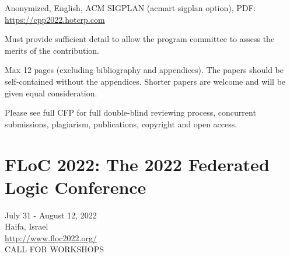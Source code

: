 \documentclass[prodmode,acmtecs]{acmsmall} %
\begin{document}
\begin{itemize}
   Anonymized, English, ACM SIGPLAN (acmart sigplan option), PDF:  \href{https://cpp2022.hotcrp.com}{https://cpp2022.hotcrp.com} 
 
   Must provide sufficient detail to allow the program committee to assess the merits of the contribution.  
 
   Max 12 pages (excluding bibliography and appendices). The papers should be self-contained without the appendices. Shorter papers are welcome and will be given equal consideration. 
 
   Please see full CFP for full double-blind reviewing process, concurrent submissions, plagiarism, publications, copyright and open access. 
 
\end{itemize}\section{FLoC 2022: The 2022 Federated Logic Conference}\label{FLoC2022}  July 31 - August 12, 2022\\ 
  Haifa, Israel\\ 
  \href{http://www.floc2022.org/}{http://www.floc2022.org/}\\ 
CALL FOR WORKSHOPS 
\end{document}
